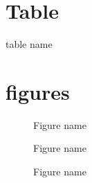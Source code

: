 \documentclass[letterpaper,12pt,onecolumn]{article}
\begin{document}
\section{Table}

\begin{table}[t]
\centering
\caption{table name\label{tab:1}}
\end{table}
\section{figures}

\blindtext
%
\begin{figure}[ht]
\centering
\caption{Figure name\label{fig:1}}
\end{figure}
\blindtext
\begin{figure}
\caption{Figure name\label{fig:1}}
\end{figure}
\blindtext
\blindtext
\begin{figure}
\begin{center}
\caption{Figure name\label{fig:1}}
\end{center}
\end{figure}
\blindtext
%
\end{document}
